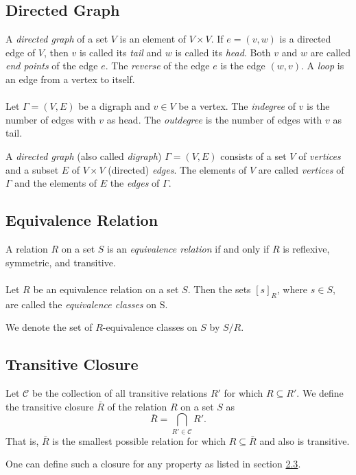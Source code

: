 \documentclass[fleqn]{article}
\begin{document}
\subsection{Directed Graph}
A \textit{directed graph} of a set $V$ is an element of $V \times V$. If $e = (v,w)$
is a directed edge of $V$, then $v$ is called its \textit{tail} and $w$ is called
its \textit{head}. Both $v$ and $w$ are called \textit{end points} of the edge $e$.
The \textit{reverse} of the edge $e$ is the edge $(w,v)$. A \textit{loop} is an edge
from a vertex to itself. \\
\\
Let $\Gamma = (V,E)$ be a digraph and $v \in V$ be a vertex. The \textit{indegree}
of $v$ is the number of edges with $v$ as head. The \textit{outdegree} is the number
of edges with $v$ as tail.

A \textit{directed graph} (also called \textit{digraph}) $\Gamma = (V,E)$ consists
of a set $V$ of \textit{vertices} and a subset $E$ of $V \times V$ (directed) \textit{edges}.
The elements of $V$ are called \textit{vertices} of $\Gamma$ and the elements of
$E$ the \textit{edges} of $\Gamma$.

\subsection{Equivalence Relation}
A relation $R$ on a set $S$ is an \textit{equivalence relation} if and only if
$R$ is reflexive, symmetric, and transitive. \\
\\
Let $R$ be an equivalence relation on a set $S$. Then the sets $[s]_R$, where $s \in S$,
are called the \textit{equivalence classes} on S.

We denote the set of $R$-equivalence classes on $S$ by $S/R$.

\subsection{Transitive Closure}
Let $\mathscr{C}$ be the collection of all transitive relations $R'$ for which $R \subseteq R'$.
We define the transitive closure $\bar{R}$ of the relation $R$ on a set $S$ as
\begin{equation*}
    \bar{R} = \bigcap_{R' \in \mathscr{C}} R'.
\end{equation*}
That is, $\bar{R}$ is the smallest possible relation for which $R \subseteq \bar{R}$
and also is transitive.

One can define such a closure for any property as listed in section \hyperref[sec:Properties]{2.3}.
\end{document}
